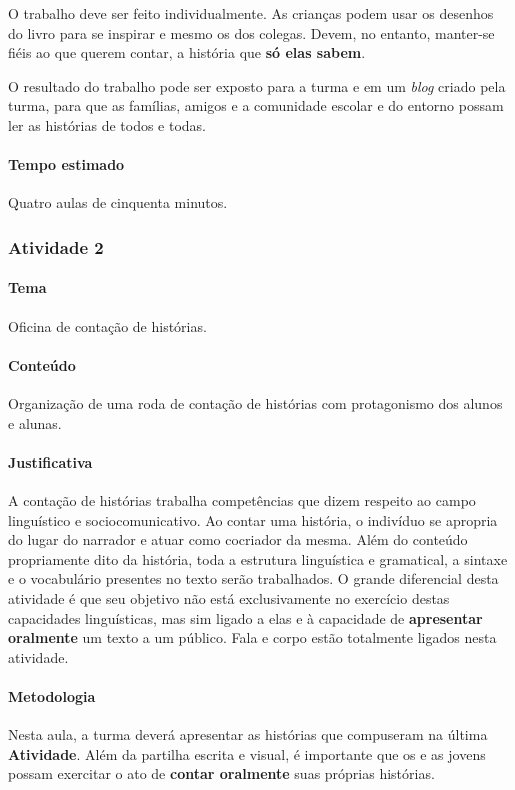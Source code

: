 \documentclass[11pt]{extarticle}
\begin{document}
O trabalho deve ser feito individualmente. As crianças podem usar os desenhos do livro
para se inspirar e mesmo os dos colegas. Devem, no entanto, manter-se fiéis 
ao que querem contar, a história que \textbf{só elas sabem}. 

O resultado do trabalho pode ser exposto para a turma e em um \textit{blog} criado
pela turma, para que as famílias, amigos e a comunidade escolar e do entorno possam 
ler as histórias de todos e todas. 

\paragraph{Tempo estimado} Quatro aulas de cinquenta minutos.


\subsubsection{Atividade 2}


\paragraph{Tema} Oficina de contação de histórias. 

\paragraph{Conteúdo} Organização de uma roda de contação de histórias
com protagonismo dos alunos e alunas.

\paragraph{Justificativa} A contação de histórias trabalha competências
que dizem respeito ao campo linguístico e sociocomunicativo. 
Ao contar uma história, o indivíduo se apropria do lugar do narrador e
atuar como cocriador da mesma. Além do conteúdo propriamente dito 
da história, toda a estrutura linguística e gramatical, a sintaxe 
e o vocabulário presentes no texto serão trabalhados. 
O grande diferencial desta atividade é que seu objetivo não está 
exclusivamente no exercício destas capacidades linguísticas, 
mas sim ligado a elas e à capacidade de \textbf{apresentar oralmente}
um texto a um público. Fala e corpo estão totalmente ligados nesta atividade. 

\paragraph{Metodologia} Nesta aula, a turma deverá apresentar as histórias
que compuseram na última \textbf{Atividade}. Além da partilha escrita e visual,
é importante que os e as jovens possam exercitar o ato de \textbf{contar oralmente}
suas próprias histórias. 
\end{document}
